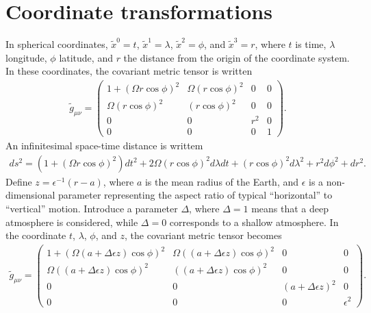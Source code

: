 \documentclass{article}
\begin{document}
\section{Coordinate transformations}
In spherical coordinates, $\tilde{x}^0 = t$, $\tilde{x}^1 = \lambda$, $\tilde{x}^2 = \phi$, and $\tilde{x}^3 = r$, where $t$ is time, $\lambda$ longitude, $\phi$ latitude, and $r$ the distance from the origin of the coordinate system. In these coordinates, the covariant metric tensor is written
\begin{align}
\tilde{g}_{\mu \nu}=\left( \begin{array}{cccc}
1+(\Omega r\cos{\phi})^2 & \Omega(r\cos{\phi})^2 & 0 & 0 \\
\Omega(r\cos{\phi})^2  & (r\cos{\phi})^2   & 0 & 0 \\
0 & 0 & r^2 & 0 \\
0 & 0 & 0 & 1 \end{array} \right). \label{gconsp}
\end{align}
An infinitesimal space-time distance is writtem
\begin{align}
ds^2=\left( 1+(\Omega r \cos\phi)^2 \right) dt^2+2\Omega (r \cos\phi)^2 d\lambda dt + (r \cos\phi)^2 d\lambda^2 +r^2 d\phi^2 + dr^2.
\end{align}
Define $z=\epsilon^{-1} (r-a)$, where $a$ is the mean radius of the Earth, and $\epsilon$ is a non-dimensional parameter representing the aspect ratio of typical ``horizontal'' to ``vertical'' motion. Introduce a parameter $\Delta$, where $\Delta=1$ means that a deep atmosphere is considered, while $\Delta=0$ corresponds to a shallow atmosphere. In the coordinate $t$, $\lambda$, $\phi$, and $z$, the covariant metric tensor becomes
\begin{align}
\tilde{g}_{\mu \nu}=\left( \begin{array}{cccc}
1+(\Omega (a+\Delta\epsilon z)\cos{\phi})^2 & \Omega((a+\Delta\epsilon z)\cos{\phi})^2 & 0 & 0 \\
\Omega((a+\Delta\epsilon z)\cos{\phi})^2  & ((a+\Delta\epsilon z)\cos{\phi})^2   & 0 & 0 \\
0 & 0 & (a+\Delta\epsilon z)^2 & 0 \\
0 & 0 & 0 & \epsilon^2 \end{array} \right). \label{gconsp}
\end{align}
\end{document}
